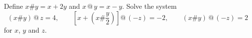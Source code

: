 Define $x\#y=x+2y$ and $x\,@\,y=x-y$. Solve the system
\[
(x\#y)\,@\,z=4,\qquad\left[x+\left(x\#\dfrac {y}{2}\right)\right]@\,(-z)=-2,\qquad(x\#y)\,@\,(-z)=2
\]
for $x$, $y$ and $z$.
